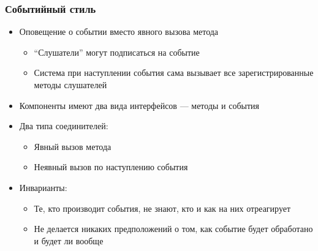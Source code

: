 \documentclass{../../slides-style}
\begin{document}
    \begin{frame}
        \frametitle{Событийный стиль}
        \begin{itemize}
            \item Оповещение о событии вместо явного вызова метода
            \begin{itemize}
                \item ``Слушатели'' могут подписаться на событие
                \item Система при наступлении события сама вызывает все зарегистрированные методы слушателей
            \end{itemize}
            \item Компоненты имеют два вида интерфейсов --- методы и события
            \item Два типа соединителей:
            \begin{itemize}
                \item Явный вызов метода
                \item Неявный вызов по наступлению события
            \end{itemize}
            \item Инварианты:
            \begin{itemize}
                \item Те, кто производит события, не знают, кто и как на них отреагирует
                \item Не делается никаких предположений о том, как событие будет обработано и будет ли вообще
            \end{itemize}
        \end{itemize}
    \end{frame}
\end{document}
